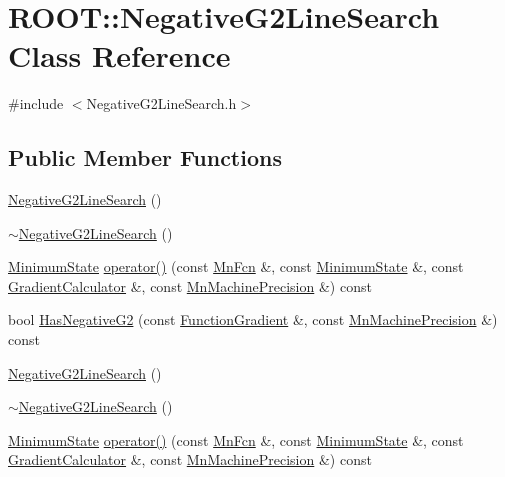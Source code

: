 \hypertarget{classROOT_1_1Minuit2_1_1NegativeG2LineSearch}{}\section{R\+O\+OT\+:\+:Negative\+G2\+Line\+Search Class Reference}
\label{classROOT_1_1Minuit2_1_1NegativeG2LineSearch}


{\ttfamily \#include $<$Negative\+G2\+Line\+Search.\+h$>$}

\subsection*{Public Member Functions}
\begin{DoxyCompactItemize}
\item 
\mbox{\hyperlink{classROOT_1_1Minuit2_1_1NegativeG2LineSearch_ac0cff4c81f89a72be26214633c14cd0e}{Negative\+G2\+Line\+Search}} ()
\item 
\mbox{\hyperlink{classROOT_1_1Minuit2_1_1NegativeG2LineSearch_a0ef5274da3c1466f321da0d596bf7a55}{$\sim$\+Negative\+G2\+Line\+Search}} ()
\item 
\mbox{\hyperlink{classROOT_1_1Minuit2_1_1MinimumState}{Minimum\+State}} \mbox{\hyperlink{classROOT_1_1Minuit2_1_1NegativeG2LineSearch_ac39ff4c0d14335bd8c8bdcede066ecdf}{operator()}} (const \mbox{\hyperlink{classROOT_1_1Minuit2_1_1MnFcn}{Mn\+Fcn}} \&, const \mbox{\hyperlink{classROOT_1_1Minuit2_1_1MinimumState}{Minimum\+State}} \&, const \mbox{\hyperlink{classROOT_1_1Minuit2_1_1GradientCalculator}{Gradient\+Calculator}} \&, const \mbox{\hyperlink{classROOT_1_1Minuit2_1_1MnMachinePrecision}{Mn\+Machine\+Precision}} \&) const
\item 
bool \mbox{\hyperlink{classROOT_1_1Minuit2_1_1NegativeG2LineSearch_a5450b0e5a0144e9c3e6028e8ae4a2c76}{Has\+Negative\+G2}} (const \mbox{\hyperlink{classROOT_1_1Minuit2_1_1FunctionGradient}{Function\+Gradient}} \&, const \mbox{\hyperlink{classROOT_1_1Minuit2_1_1MnMachinePrecision}{Mn\+Machine\+Precision}} \&) const
\item 
\mbox{\hyperlink{classROOT_1_1Minuit2_1_1NegativeG2LineSearch_ac0cff4c81f89a72be26214633c14cd0e}{Negative\+G2\+Line\+Search}} ()
\item 
\mbox{\hyperlink{classROOT_1_1Minuit2_1_1NegativeG2LineSearch_a0ef5274da3c1466f321da0d596bf7a55}{$\sim$\+Negative\+G2\+Line\+Search}} ()
\item 
\mbox{\hyperlink{classROOT_1_1Minuit2_1_1MinimumState}{Minimum\+State}} \mbox{\hyperlink{classROOT_1_1Minuit2_1_1NegativeG2LineSearch_ac39ff4c0d14335bd8c8bdcede066ecdf}{operator()}} (const \mbox{\hyperlink{classROOT_1_1Minuit2_1_1MnFcn}{Mn\+Fcn}} \&, const \mbox{\hyperlink{classROOT_1_1Minuit2_1_1MinimumState}{Minimum\+State}} \&, const \mbox{\hyperlink{classROOT_1_1Minuit2_1_1GradientCalculator}{Gradient\+Calculator}} \&, const \mbox{\hyperlink{classROOT_1_1Minuit2_1_1MnMachinePrecision}{Mn\+Machine\+Precision}} \&) const

\end{DoxyCompactItemize}
